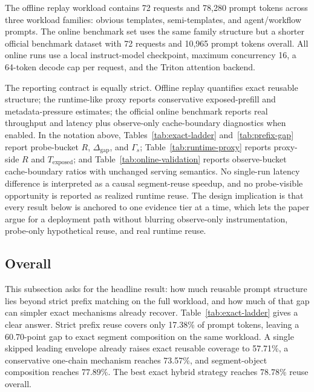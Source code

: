 \documentclass[conference]{IEEEtran}
\begin{document}
The offline replay workload contains 72 requests and 78{,}280 prompt tokens across three workload families: obvious templates, semi-templates, and agent/workflow prompts. The online benchmark set uses the same family structure but a shorter official benchmark dataset with 72 requests and 10{,}965 prompt tokens overall. All online runs use a local instruct-model checkpoint, maximum concurrency 16, a 64-token decode cap per request, and the Triton attention backend.

The reporting contract is equally strict. Offline replay quantifies exact reusable structure; the runtime-like proxy reports conservative exposed-prefill and metadata-pressure estimates; the official online benchmark reports real throughput and latency plus observe-only cache-boundary diagnostics when enabled. In the notation above, Tables~\ref{tab:exact-ladder} and~\ref{tab:prefix-gap} report probe-bucket $R$, $\Delta_{\text{gap}}$, and $\Gamma_s$; Table~\ref{tab:runtime-proxy} reports proxy-side $R$ and $T_{\text{exposed}}$; and Table~\ref{tab:online-validation} reports observe-bucket cache-boundary ratios with unchanged serving semantics. No single-run latency difference is interpreted as a causal segment-reuse speedup, and no probe-visible opportunity is reported as realized runtime reuse. The design implication is that every result below is anchored to one evidence tier at a time, which lets the paper argue for a deployment path without blurring observe-only instrumentation, probe-only hypothetical reuse, and real runtime reuse.

\subsection{Overall}

This subsection asks for the headline result: how much reusable prompt structure lies beyond strict prefix matching on the full workload, and how much of that gap can simpler exact mechanisms already recover. Table~\ref{tab:exact-ladder} gives a clear answer. Strict prefix reuse covers only 17.38\% of prompt tokens, leaving a 60.70-point gap to exact segment composition on the same workload. A single skipped leading envelope already raises exact reusable coverage to 57.71\%, a conservative one-chain mechanism reaches 73.57\%, and segment-object composition reaches 77.89\%. The best exact hybrid strategy reaches 78.78\% reuse overall.
\end{document}
